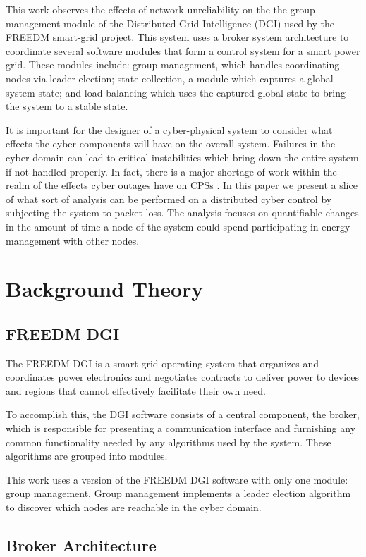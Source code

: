 \documentclass{llncs}
\begin{document}
This work observes the effects of network unreliability on the the group management module of the Distributed Grid Intelligence (DGI) used by the FREEDM smart-grid project. This system uses a broker system architecture to coordinate several software modules that form a control system for a smart power grid. These modules include: group management, which handles coordinating nodes via leader election; state collection, a module which
captures a global system state; and load balancing which uses the captured global state to bring the system to a stable state.

It is important for the designer of a cyber-physical system to consider what effects the cyber components will have on the overall system. Failures in the cyber domain can lead to critical instabilities which bring down the entire system if not handled properly.  In fact, there is a major shortage of work within the realm of the effects cyber outages have on CPSs \cite{CYBERRESEARCHCALL} \cite{SMARTGRIDBENEFITS}.
In this paper we present a slice of what sort of analysis can be performed on a distributed cyber control by subjecting the system to packet loss. The analysis focuses on quantifiable changes in the amount of time a node of the system could spend participating in energy management with other nodes.

\section{Background Theory}
\subsection{FREEDM DGI}
The FREEDM DGI is a smart grid operating system that organizes and coordinates power electronics and negotiates contracts to deliver power to devices and regions that cannot effectively facilitate their own need.

To accomplish this, the DGI software consists of a central component, the broker, which is responsible for presenting a communication interface and furnishing any common functionality needed by any algorithms used by the system. These algorithms are grouped into modules.

This work uses a version of the FREEDM DGI software with only one module: group management. Group management implements a leader election algorithm to discover which nodes are reachable in the cyber domain.

\subsection{Broker Architecture}
\end{document}
